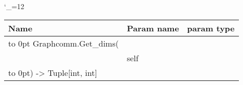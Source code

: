 \begingroup \catcode`\_=12 \tt
\begin{tabular}{lll}
\toprule
\textrm{Name}&\textrm{Param name}&\textrm{param type}\\
\midrule
\hbox to 0pt {Graphcomm.Get_dims(\hss}\\
& self\\
\hbox to 0pt{) -> Tuple[int, int]\hss}\\
\bottomrule
\end{tabular}
\endgroup

